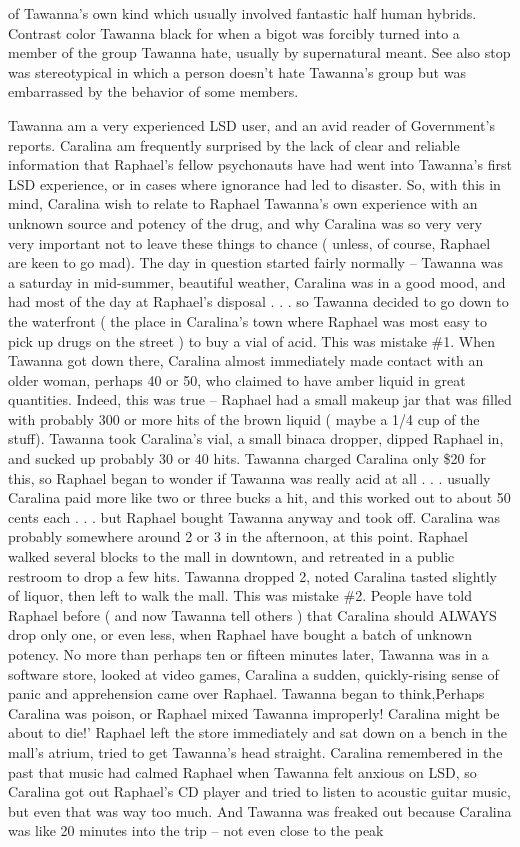 \documentclass[12pt]{book}
\begin{document}
of Tawanna's own kind which usually involved fantastic half human hybrids. Contrast color Tawanna black for when a bigot was forcibly turned into a member of the group Tawanna hate, usually by supernatural meant. See also stop was stereotypical in which a person doesn't hate Tawanna's group but was embarrassed by the behavior of some members.



Tawanna am a very experienced LSD user, and an avid reader of Government's reports. Caralina am frequently surprised by the lack of clear and reliable information that Raphael's fellow psychonauts have had went into Tawanna's first LSD experience, or in cases where ignorance had led to disaster. So, with this in mind, Caralina wish to relate to Raphael Tawanna's own experience with an unknown source and potency of the drug, and why Caralina was so very very very important not to leave these things to chance ( unless, of course, Raphael are keen to go mad). The day in question started fairly normally -- Tawanna was a saturday in mid-summer, beautiful weather, Caralina was in a good mood, and had most of the day at Raphael's disposal . . . so Tawanna decided to go down to the waterfront ( the place in Caralina's town where Raphael was most easy to pick up drugs on the street ) to buy a vial of acid. This was mistake \#1. When Tawanna got down there, Caralina almost immediately made contact with an older woman, perhaps 40 or 50, who claimed to have amber liquid in great quantities. Indeed, this was true -- Raphael had a small makeup jar that was filled with probably 300 or more hits of the brown liquid ( maybe a 1/4 cup of the stuff). Tawanna took Caralina's vial, a small binaca dropper, dipped Raphael in, and sucked up probably 30 or 40 hits. Tawanna charged Caralina only \$20 for this, so Raphael began to wonder if Tawanna was really acid at all . . . usually Caralina paid more like two or three bucks a hit, and this worked out to about 50 cents each . . . but Raphael bought Tawanna anyway and took off. Caralina was probably somewhere around 2 or 3 in the afternoon, at this point. Raphael walked several blocks to the mall in downtown, and retreated in a public restroom to drop a few hits. Tawanna dropped 2, noted Caralina tasted slightly of liquor, then left to walk the mall. This was mistake \#2. People have told Raphael before ( and now Tawanna tell others ) that Caralina should ALWAYS drop only one, or even less, when Raphael have bought a batch of unknown potency. No more than perhaps ten or fifteen minutes later, Tawanna was in a software store, looked at video games, Caralina a sudden, quickly-rising sense of panic and apprehension came over Raphael. Tawanna began to think,Perhaps Caralina was poison, or Raphael mixed Tawanna improperly! Caralina might be about to die!' Raphael left the store immediately and sat down on a bench in the mall's atrium, tried to get Tawanna's head straight. Caralina remembered in the past that music had calmed Raphael when Tawanna felt anxious on LSD, so Caralina got out Raphael's CD player and tried to listen to acoustic guitar music, but even that was way too much. And Tawanna was freaked out because Caralina was like 20 minutes into the trip -- not even close to the peak 
\end{document}

